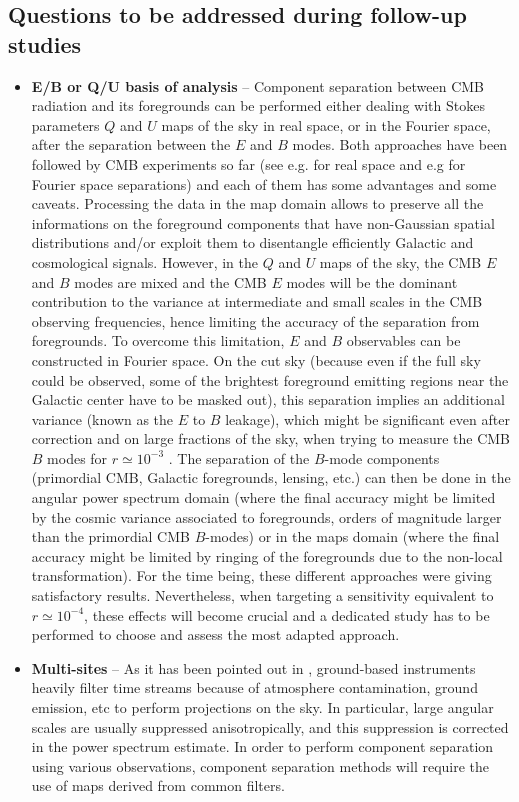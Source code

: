 \subsection{Questions to be addressed during follow-up studies}
\begin{itemize}
	\item \textbf{E/B or Q/U basis of analysis} -- Component separation between CMB radiation and its foregrounds can be performed either dealing with Stokes parameters $Q$ and $U$ maps of the sky in real space, or in the Fourier space, after the separation between the $E$ and $B$ modes. Both approaches have been followed by CMB experiments so far (see e.g. \cite{gold11,planck15-11} for real space and e.g \cite{bicepkeckplanck15} for Fourier space separations) and each of them has some advantages and some caveats. Processing the data in the map domain allows to preserve all the informations on the foreground components that have non-Gaussian spatial distributions and/or exploit them to disentangle efficiently Galactic and cosmological signals. However, in the $Q$ and $U$ maps of the sky, the CMB $E$ and $B$ modes are mixed and the CMB $E$ modes will be the dominant contribution to the variance at intermediate and small scales in the CMB observing frequencies, hence limiting the accuracy of the separation from foregrounds. To overcome this limitation, $E$ and $B$ observables can be constructed in Fourier space. On the cut sky (because even if the full sky could be observed, some of the brightest foreground emitting regions near the Galactic center have to be masked out), this separation implies an additional variance (known as the $E$ to $B$ leakage), which might be significant even after correction and on large fractions of the sky, when trying to measure the CMB $B$ modes for $r\simeq10^{-3}$ \cite{ferte13}. The separation of the $B$-mode components (primordial CMB, Galactic foregrounds, lensing, etc.) can then be done in the angular power spectrum domain (where the final accuracy might be limited by the cosmic variance associated to foregrounds, orders of magnitude larger than the primordial CMB $B$-modes) or in the maps domain (where the final accuracy might be limited by ringing of the foregrounds due to the non-local transformation). For the time being, these different approaches were giving satisfactory results. Nevertheless, when targeting a sensitivity equivalent to $r\simeq10^{-4}$, these effects will become crucial and a dedicated study has to be performed to choose and assess the most adapted approach.  
	\item \textbf{Multi-sites} -- As it has been pointed out in \cite{bicepkeckplanck15}, ground-based instruments heavily filter time streams because of atmosphere contamination, ground emission, etc to perform projections on the sky. In particular, large angular scales are usually suppressed anisotropically, and this suppression is corrected in the power spectrum estimate. In order to perform component separation using various observations, component separation methods will require the use of maps derived from common filters.

\end{itemize}
